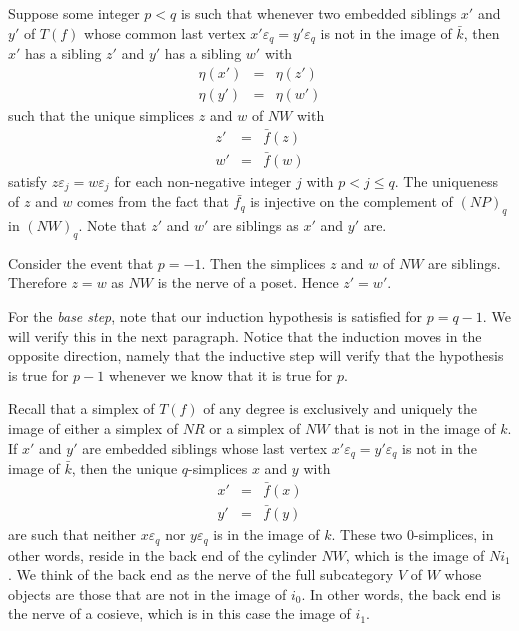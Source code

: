 Suppose some integer $p<q$ is such that whenever two embedded siblings $x'$ and $y'$ of $T(f)$ whose common last vertex $x'\varepsilon _q=y'\varepsilon _q$ is not in the image of $\bar{k}$, then $x'$ has a sibling $z'$ and $y'$ has a sibling $w'$ with
\begin{displaymath}
\begin{array}{rcl}
\eta (x') & = & \eta (z') \\
\eta (y') & = & \eta (w')
\end{array}
\end{displaymath}
such that the unique simplices $z$ and $w$ of $NW$ with
\begin{displaymath}
\begin{array}{rcl}
z' & = & \bar{f} (z) \\
w' & = & \bar{f} (w)
\end{array}
\end{displaymath}
satisfy $z\varepsilon _j=w\varepsilon _j$ for each non-negative integer $j$ with $p<j\leq q$. The uniqueness of $z$ and $w$ comes from the fact that $\bar{f_q}$ is injective on the complement of $(NP)_q$ in $(NW)_q$. Note that $z'$ and $w'$ are siblings as $x'$ and $y'$ are.

Consider the event that $p=-1$. Then the simplices $z$ and $w$ of $NW$ are siblings. Therefore $z=w$ as $NW$ is the nerve of a poset. Hence $z'=w'$.

For the \emph{base step}, note that our induction hypothesis is satisfied for $p=q-1$. We will verify this in the next paragraph. Notice that the induction moves in the opposite direction, namely that the inductive step will verify that the hypothesis is true for $p-1$ whenever we know that it is true for $p$.

Recall that a simplex of $T(f)$ of any degree is exclusively and uniquely the image of either a simplex of $NR$ or a simplex of $NW$ that is not in the image of $k$. If $x'$ and $y'$ are embedded siblings whose last vertex $x'\varepsilon _q=y'\varepsilon _q$ is not in the image of $\bar{k}$, then the unique $q$-simplices $x$ and $y$ with
\begin{displaymath}
\begin{array}{rcl}
x' & = & \bar{f} (x) \\
y' & = & \bar{f} (y)
\end{array}
\end{displaymath}
are such that neither $x\varepsilon _q$ nor $y\varepsilon _q$ is in the image of $k$. These two $0$-simplices, in other words, reside in the back end of the cylinder $NW$, which is the image of $Ni_1$. We think of the back end as the nerve of the full subcategory $V$ of $W$ whose objects are those that are not in the image of $i_0$. In other words, the back end is the nerve of a cosieve, which is in this case the image of $i_1$.

